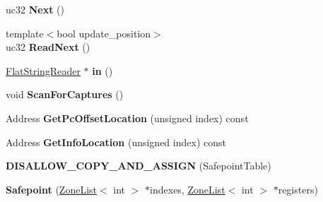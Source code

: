 \begin{DoxyCompactItemize}
\item 
uc32 {\bfseries Next} ()\hypertarget{classv8_1_1internal_1_1_b_a_s_e___e_m_b_e_d_d_e_d_a2f19b6d3b48af5323bdaa331008e55e9}{}\label{classv8_1_1internal_1_1_b_a_s_e___e_m_b_e_d_d_e_d_a2f19b6d3b48af5323bdaa331008e55e9}

\item 
{\footnotesize template$<$bool update\+\_\+position$>$ }\\uc32 {\bfseries Read\+Next} ()\hypertarget{classv8_1_1internal_1_1_b_a_s_e___e_m_b_e_d_d_e_d_a5fa3df274118f5f021a00012142dd89f}{}\label{classv8_1_1internal_1_1_b_a_s_e___e_m_b_e_d_d_e_d_a5fa3df274118f5f021a00012142dd89f}

\item 
\hyperlink{classv8_1_1internal_1_1_flat_string_reader}{Flat\+String\+Reader} $\ast$ {\bfseries in} ()\hypertarget{classv8_1_1internal_1_1_b_a_s_e___e_m_b_e_d_d_e_d_a261fd1d63604e57e70e263e4560fc9ef}{}\label{classv8_1_1internal_1_1_b_a_s_e___e_m_b_e_d_d_e_d_a261fd1d63604e57e70e263e4560fc9ef}

\item 
void {\bfseries Scan\+For\+Captures} ()\hypertarget{classv8_1_1internal_1_1_b_a_s_e___e_m_b_e_d_d_e_d_a111b7a9e81f05069f61d64606ee90e06}{}\label{classv8_1_1internal_1_1_b_a_s_e___e_m_b_e_d_d_e_d_a111b7a9e81f05069f61d64606ee90e06}

\item 
Address {\bfseries Get\+Pc\+Offset\+Location} (unsigned index) const \hypertarget{classv8_1_1internal_1_1_b_a_s_e___e_m_b_e_d_d_e_d_a551462e0edb5829c0cd2839cda9b49a2}{}\label{classv8_1_1internal_1_1_b_a_s_e___e_m_b_e_d_d_e_d_a551462e0edb5829c0cd2839cda9b49a2}

\item 
Address {\bfseries Get\+Info\+Location} (unsigned index) const \hypertarget{classv8_1_1internal_1_1_b_a_s_e___e_m_b_e_d_d_e_d_a7f795131070a03347856ea302c11d23e}{}\label{classv8_1_1internal_1_1_b_a_s_e___e_m_b_e_d_d_e_d_a7f795131070a03347856ea302c11d23e}

\item 
{\bfseries D\+I\+S\+A\+L\+L\+O\+W\+\_\+\+C\+O\+P\+Y\+\_\+\+A\+N\+D\+\_\+\+A\+S\+S\+I\+GN} (Safepoint\+Table)\hypertarget{classv8_1_1internal_1_1_b_a_s_e___e_m_b_e_d_d_e_d_a2ee456e83360897642900ff93c5dd73a}{}\label{classv8_1_1internal_1_1_b_a_s_e___e_m_b_e_d_d_e_d_a2ee456e83360897642900ff93c5dd73a}

\item 
{\bfseries Safepoint} (\hyperlink{classv8_1_1internal_1_1_zone_list}{Zone\+List}$<$ int $>$ $\ast$indexes, \hyperlink{classv8_1_1internal_1_1_zone_list}{Zone\+List}$<$ int $>$ $\ast$registers)\hypertarget{classv8_1_1internal_1_1_b_a_s_e___e_m_b_e_d_d_e_d_a02887fabaabab3172f239ed7127ff520}{}\label{classv8_1_1internal_1_1_b_a_s_e___e_m_b_e_d_d_e_d_a02887fabaabab3172f239ed7127ff520}


\end{DoxyCompactItemize}
